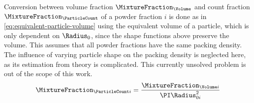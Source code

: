 Conversion between volume fraction $\MixtureFraction_{\Volume}$ and count fraction $\MixtureFraction_{\ParticleCount}$ of a powder fraction $i$ is done as in \cref{eq:equivalent-particle-volume} using the equivalent volume of a particle, which is only dependent on $\Radius_0$, since the shape functions above preserve the volume.
This assumes that all powder fractions have the same packing density.
The influence of varying particle shape on the packing density is neglected here, as its estimation from theory is complicated.
This currently unsolved problem is out of the scope of this work.
\begin{equation}
    \MixtureFraction_{\ParticleCount i} = \frac{\MixtureFraction_{\Volume i}}{\PI \Radius_{0 i} ^ 2}
    \label{eq:equivalent-particle-volume}
\end{equation}
